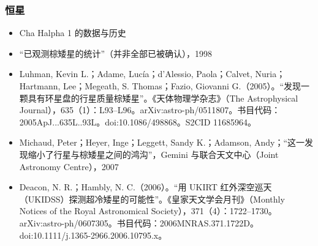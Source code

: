 \subsubsection{恒星}
\begin{itemize}
\item Cha Halpha 1 的数据与历史
\item “已观测棕矮星的统计”（并非全部已被确认），1998
\item Luhman, Kevin L.；Adame, Lucía；d’Alessio, Paola；Calvet, Nuria；Hartmann, Lee；Megeath, S. Thomas；Fazio, Giovanni G.（2005）。“发现一颗具有环星盘的行星质量棕矮星”。《天体物理学杂志》（The Astrophysical Journal），635（1）：L93–L96。arXiv:astro-ph/0511807。书目代码：2005ApJ...635L..93L。doi:10.1086/498868。S2CID 11685964。
\item Michaud, Peter；Heyer, Inge；Leggett, Sandy K.；Adamson, Andy；“这一发现缩小了行星与棕矮星之间的鸿沟”，Gemini 与联合天文中心（Joint Astronomy Centre），2007
\item Deacon, N. R.；Hambly, N. C.（2006）。“用 UKIRT 红外深空巡天（UKIDSS）探测超冷矮星的可能性”。《皇家天文学会月刊》（Monthly Notices of the Royal Astronomical Society），371（4）：1722–1730。arXiv:astro-ph/0607305。书目代码：2006MNRAS.371.1722D。doi:10.1111/j.1365-2966.2006.10795.x。
\end{itemize}